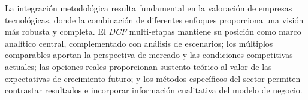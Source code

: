 La integración metodológica resulta fundamental en la valoración de empresas tecnológicas, donde la combinación de diferentes enfoques proporciona una visión más robusta y completa. El \emph{DCF} multi-etapas mantiene su posición como marco analítico central, complementado con análisis de escenarios; los múltiplos comparables aportan la perspectiva de mercado y las condiciones competitivas actuales; las opciones reales proporcionan sustento teórico al valor de las expectativas de crecimiento futuro; y los métodos específicos del sector permiten contrastar resultados e incorporar información cualitativa del modelo de negocio. 